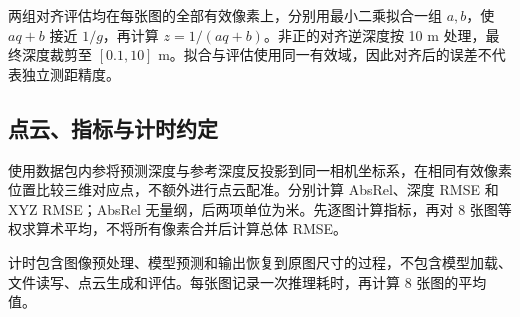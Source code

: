 两组对齐评估均在每张图的全部有效像素上，分别用最小二乘拟合一组 $a,b$，使 $aq+b$ 接近 $1/g$，再计算 $z=1/(aq+b)$。非正的对齐逆深度按 10 m 处理，最终深度裁剪至 $[0.1,10]$ m。拟合与评估使用同一有效域，因此对齐后的误差不代表独立测距精度。

\subsection{点云、指标与计时约定}

使用数据包内参将预测深度与参考深度反投影到同一相机坐标系，在相同有效像素位置比较三维对应点，不额外进行点云配准。分别计算 AbsRel、深度 RMSE 和 XYZ RMSE；AbsRel 无量纲，后两项单位为米。先逐图计算指标，再对 8 张图等权求算术平均，不将所有像素合并后计算总体 RMSE。

计时包含图像预处理、模型预测和输出恢复到原图尺寸的过程，不包含模型加载、文件读写、点云生成和评估。每张图记录一次推理耗时，再计算 8 张图的平均值。
